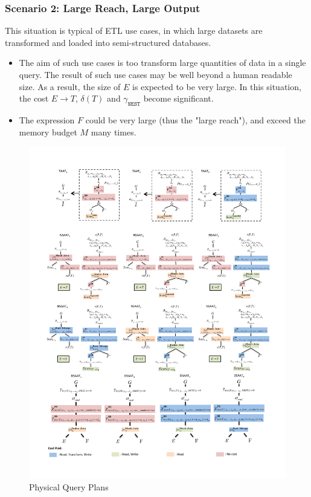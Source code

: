 \subsubsection{Scenario 2: Large Reach, Large Output}

This situation is typical of ETL use cases, in which large datasets are transformed and loaded into semi-structured databases. 

\begin{itemize}
\item{The aim of such use cases is too transform large quantities of data in a single query. The result of such use cases may be well beyond a human readable size. As a result, the size of $E$ is expected to be very large. In this situation, the cost $E \rightarrow T$, $\delta(T)$ and $\gamma_{\texttt{NEST}}$ become significant.}
\item {The expression $F$ could be very large (thus the "large reach"), and exceed the memory budget $M$ many times.}
\end{itemize}

\begin{figure}[h]
\centering
\caption{Physical Query Plans \label{fig:plans}}
\includegraphics[width=\linewidth]{images/PhysicalPlans.pdf}
\end{figure}

